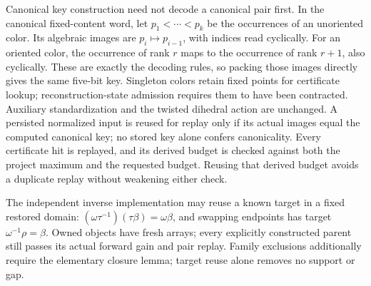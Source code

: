 \documentclass[11pt,a4paper]{article}
\begin{document}
Canonical key construction need not decode a canonical pair first. In the
canonical fixed-content word, let $p_1<\cdots<p_k$ be the occurrences of an
unoriented color. Its algebraic images are $p_i\mapsto p_{i-1}$, with indices
read cyclically. For an oriented color, the occurrence of rank $r$ maps to the
occurrence of rank $r+1$, also cyclically. These are exactly the decoding rules,
so packing those images directly gives the same five-bit key. Singleton colors
retain fixed points for certificate lookup; reconstruction-state admission
requires them to have been contracted. Auxiliary standardization and the twisted
dihedral action are unchanged. A persisted normalized input is reused for replay
only if its actual images equal the computed canonical key; no stored key alone
confers canonicality. Every certificate hit is replayed, and its derived budget
is checked against both the project maximum and the requested budget. Reusing
that derived budget avoids a duplicate replay without weakening either check.

The independent inverse implementation may reuse a known target in a fixed
restored domain: $(\omega\tau^{-1})(\tau\beta)=\omega\beta$, and swapping
endpoints has target $\omega^{-1}\rho=\beta$. Owned objects have fresh arrays;
every explicitly constructed parent still passes its actual forward gain and
pair replay. Family exclusions additionally require the elementary closure
lemma; target reuse alone removes no support or gap.
\end{document}
